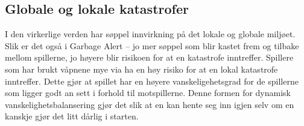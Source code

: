 

\subsection{Globale og lokale katastrofer}\label{sec:hazards}

I den virkerlige verden har søppel innvirkning på det lokale og globale miljøet. Slik er det også i Garbage Alert – jo mer søppel som blir kastet frem og tilbake mellom spillerne, jo høyere blir risikoen for at en katastrofe inntreffer. Spillere som har brukt våpnene mye via ha en høy risiko for at en lokal katastrofe inntreffer. Dette gjør at spillet har en høyere vanskeligehetsgrad for de spillerne som ligger godt an sett i forhold til motspillerne. Denne formen for dynamisk vanskelighetsbalansering gjør det slik at en kan hente seg inn igjen selv om en kanskje gjør det litt dårlig i starten.

